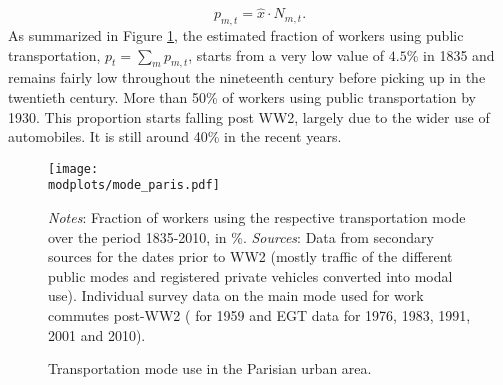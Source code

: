 \documentclass[11pt]{report}
\newcommand{\round}{revision3}  %
\newcommand{\modplots}{../../output/model/plots/\round}
\begin{document}
\begin{equation*}
p_{m,t}=\hat{x} \cdot N_{m,t}.
\end{equation*}
As summarized in Figure \ref{A-fig:mode}, the estimated fraction of workers using public transportation, $p_t=\sum_m p_{m,t}$, starts from a very low value of $4.5\%$ in 1835 and remains fairly low throughout the nineteenth century before picking up in the twentieth century. More than 50\% of workers using public transportation by 1930. This proportion starts falling post WW2, largely due to the wider use of automobiles. It is still around 40\% in the recent years.


\begin{figure}[h!]
	\begin{center}
		\texttt{[image: \\modplots/mode\_paris.pdf]}
	\end{center}
	\vspace{-0.5cm}
	\caption{Transportation mode use in the Parisian urban area.\label{A-fig:mode}}
	
	\footnotesize {\textit{%
			Notes}: Fraction of workers using the respective transportation mode over the period 1835-2010, in \%.
		\textit{Sources}: Data from secondary sources for the dates prior to WW2 (mostly traffic of the different public modes and registered private vehicles converted into modal use). Individual survey data on the main mode used for work commutes post-WW2 (\cite{bertrand1962enquete} for 1959 and EGT data for 1976, 1983, 1991, 2001 and 2010).}
\end{figure}
\end{document}
